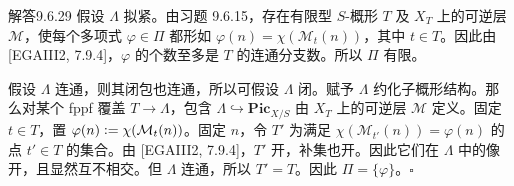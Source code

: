 \begin{origstatement}{解答}{9.6.29}\label{appA:ans9629}
假设 $\Lambda$ 拟紧。由习题 9.6.15，存在有限型 $S$-概形 $T$ 及 $X_T$ 上的可逆层 $\mathcal M$，使每个多项式 $\varphi\in\Pi$ 都形如 $\varphi(n)=\chi(\mathcal M_t(n))$，其中 $t\in T$。因此由 [EGAIII2, 7.9.4]，$\varphi$ 的个数至多是 $T$ 的连通分支数。所以 $\Pi$ 有限。

假设 $\Lambda$ 连通，则其闭包也连通，所以可假设 $\Lambda$ 闭。赋予 $\Lambda$ 约化子概形结构。那么对某个 fppf 覆盖 $T\to\Lambda$，包含 $\Lambda\hookrightarrow\mathbf{Pic}_{X/S}$ 由 $X_T$ 上的可逆层 $\mathcal M$ 定义。固定 $t\in T$，置 $\varphi(n)\mathrel{\mathop:}=\chi(\mathcal M_t(n))$。固定 $n$，令 $T'$ 为满足 $\chi(\mathcal M_{t'}(n))=\varphi(n)$ 的点 $t'\in T$ 的集合。由 [EGAIII2, 7.9.4]，$T'$ 开，补集也开。因此它们在 $\Lambda$ 中的像开，且显然互不相交。但 $\Lambda$ 连通，所以 $T'=T$。因此 $\Pi=\{\varphi\}$。\hfill$\square$
\end{origstatement}
